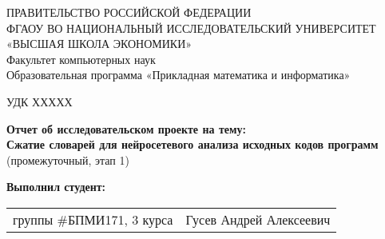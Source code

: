 \begin{titlepage}
    \newpage
    
    {
    \begin{center}
    ПРАВИТЕЛЬСТВО РОССИЙСКОЙ ФЕДЕРАЦИИ\\
    ФГАОУ ВО НАЦИОНАЛЬНЫЙ ИССЛЕДОВАТЕЛЬСКИЙ УНИВЕРСИТЕТ\\
    «ВЫСШАЯ ШКОЛА ЭКОНОМИКИ»
    \\
    \bigskip
    Факультет компьютерных наук\\
    Образовательная программа «Прикладная математика и информатика»
    \end{center}
    }
    
    \vspace{2em}
    УДК ХХХХХ %
    \vspace{4em}
    
    \begin{center}
    {\bf Отчет об исследовательском проекте на тему:}\\
    {\bf Сжатие словарей для нейросетевого анализа исходных кодов программ}\\
    (промежуточный, этап 1)
    \end{center}
    
    \vspace{2em}
    
    {\bf Выполнил студент: \vspace{2mm}}
    
    {
    \begin{tabular}{l@{\hskip 1.5cm}l}
    группы \#БПМИ171, 3 курса & Гусев Андрей Алексеевич \\
    \end{tabular}}
    
    

\end{titlepage}
